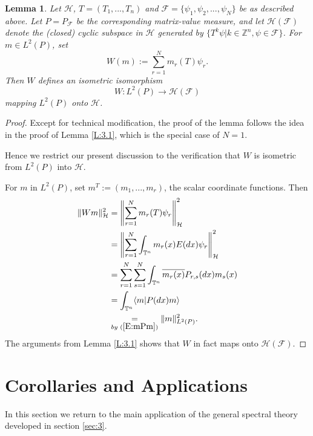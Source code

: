 \documentclass{birkmult}
\newtheorem{lem}[thm]{Lemma}
\theoremstyle{definition}
\theoremstyle{remark}
\numberwithin{equation}{section}
\begin{document}
\begin{lem}
\label{L:3.3}
Let $\mathcal{H}$, $T=(T_{1}, ..., T_{n})$ and 
$\mathcal{F} = \{\psi_{1}, \psi_{2}, ..., \psi_{N}\}$ be as described above.
Let $P=P_{\mathcal{F}}$ be the corresponding matrix-value measure, and let
$\mathcal{H}(\mathcal{F})$ denote the (closed) cyclic subspace in 
$\mathcal{H}$ generated by 
$\{T^{k}\psi|k \in \mathbb{Z}^{n}, \psi \in \mathcal{F} \}$.  For 
$m \in L^{2}(P)$, set
\begin{equation}
\label{E:Wmsum}
  W(m) := \sum_{r=1}^{N} m_{r}(T)\psi_{r}.
\end{equation}
Then $W$ defines an isometric isomorphism
\[
  W:L^{2}(P) \to \mathcal{H}(\mathcal{F})
\]
mapping $L^{2}(P)$ onto $\mathcal{H}$.
\end{lem}
\begin{proof}
Except for technical modification, the proof of the lemma follows the idea
in the proof of Lemma \ref{L:3.1}, which is the special case of $N=1$.

Hence we restrict our present discussion to the verification that $W$ is 
isometric from $L^{2}(P)$ into $\mathcal{H}$.

For $m$ in $L^{2}(P)$, set $m^{T}:=(m_{1}, ..., m_{r})$, the scalar coordinate
functions.  Then
\begin{align*}
  \|Wm\|_{\mathcal{H}}^{2} 
  &= \left\Vert \sum_{r=1}^{N}m_{r}(T)\psi_{r}\right\Vert_{\mathcal{H}}^{2} \\
  &= \left\Vert \sum_{r=1}^{N} \int_{\mathbb{T}^{n}}m_{r}(x)E(dx)\psi_{r}\right\Vert_{\mathcal{H}}^{2} \\
  &= \sum_{r=1}^{N}\sum_{s=1}^{N} \int_{\mathbb{T}^{n}} \overline{m_{r}(x)}
  P_{r,s}(dx)m_{s}(x) \\
  &= \int_{\mathbb{T}^{n}} \langle m| P(dx)m \rangle \\
  &\underset{by \text{ } (\ref{E:mPm})}{=} \|m\|_{L^{2}(P)}^{2}.
\end{align*}
The arguments from Lemma \ref{L:3.1} shows that $W$ in fact maps onto 
$\mathcal{H}(\mathcal{F})$.
\end{proof}

\section{Corollaries and Applications}
\label{sec:4}

In this section we return to the main application of the general 
spectral theory developed in section \ref{sec:3}.
\end{document}
